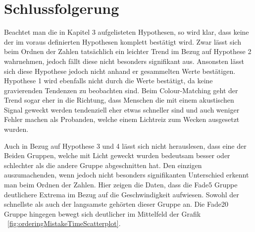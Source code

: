 \chapter{Schlussfolgerung}


Beachtet man die in Kapitel 3 aufgelisteten Hypothesen, so wird klar, dass keine der im voraus definierten Hypothesen komplett bestätigt wird. Zwar lässt sich beim Ordnen der Zahlen tatsächlich ein leichter Trend im Bezug auf Hypothese 2 wahrnehmen, jedoch fällt diese nicht besonders signifikant aus. Ansonsten lässt sich diese Hypothese jedoch nicht anhand er gesammelten Werte bestätigen. Hypothese 1 wird ebenfalls nicht durch die Werte bestätigt, da keine gravierenden Tendenzen zu beobachten sind. Beim Colour-Matching geht der Trend sogar eher in die Richtung, dass Menschen die mit einem akustischen Signal geweckt werden tendenziell eher etwas schneller sind und auch weniger Fehler machen als Probanden, welche einem Lichtreiz zum Wecken ausgesetzt wurden.

Auch in Bezug auf Hypothese 3 und 4 lässt sich nicht herauslesen, dass eine der Beiden Gruppen, welche mit Licht geweckt wurden bedeutsam besser oder schlechter als die andere Gruppe abgeschnitten hat. Den einzigen auszumachenden, wenn jedoch nicht besonders signifikanten Unterschied erkennt man beim Ordnen der Zahlen. Hier zeigen die Daten, dass die Fade5 Gruppe deutlichere Extrema im Bezug auf die Geschwindigkeit aufwiesen. Sowohl der schnellste als auch der langsamste gehörten dieser Gruppe an. Die Fade20 Gruppe hingegen bewegt sich deutlicher im Mittelfeld der Grafik ~\ref{fig:orderingMistakeTimeScatterplot}.

